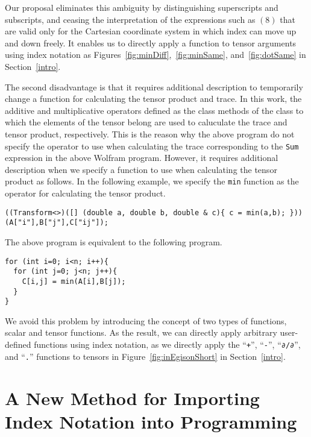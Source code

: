 \documentclass[acmlarge]{acmart}
\begin{document}
Our proposal eliminates this ambiguity by distinguishing superscripts and subscripts, and ceasing the interpretation of the expressions such as $(8)$ that are valid only for the Cartesian coordinate system in which index can move up and down freely.
It enables us to directly apply a function to tensor arguments using index notation as Figures~\ref{fig:minDiff},~\ref{fig:minSame}, and~\ref{fig:dotSame} in Section~\ref{intro}.

The second disadvantage is that it requires additional description to temporarily change a function for calculating the tensor product and trace.
In this work, the additive and multiplicative operators defined as the class methods of the class to which the elements of the tensor belong are used to caluculate the trace and tensor product, respectively.
This is the reason why the above program do not specify the operator to use when calculating the trace corresponding to the \texttt{Sum} expression in the above Wolfram program.
However, it requires additional description when we specify a function to use when calculating the tensor product as follows.
In the following example, we specify the \texttt{min} function as the operator for calculating the tensor product.

{\footnotesize
\begin{verbatim}
((Transform<>)([] (double a, double b, double & c){ c = min(a,b); }))(A["i"],B["j"],C["ij"]);
\end{verbatim}
}

The above program is equivalent to the following program.

{\footnotesize
\begin{verbatim}
for (int i=0; i<n; i++){
  for (int j=0; j<n; j++){
    C[i,j] = min(A[i],B[j]);
  }
}
\end{verbatim}
}

We avoid this problem by introducing the concept of two types of functions, scalar and tensor functions.
As the result, we can directly apply arbitrary user-defined functions using index notation, as we directly apply the ``\texttt{+}'', ``\texttt{-}'', ``\texttt{∂/∂}'', and ``\texttt{.}'' functions to tensors in Figure~\ref{fig:inEgisonShort} in Section~\ref{intro}.

\section{A New Method for Importing Index Notation into Programming}\label{egison}
\end{document}
